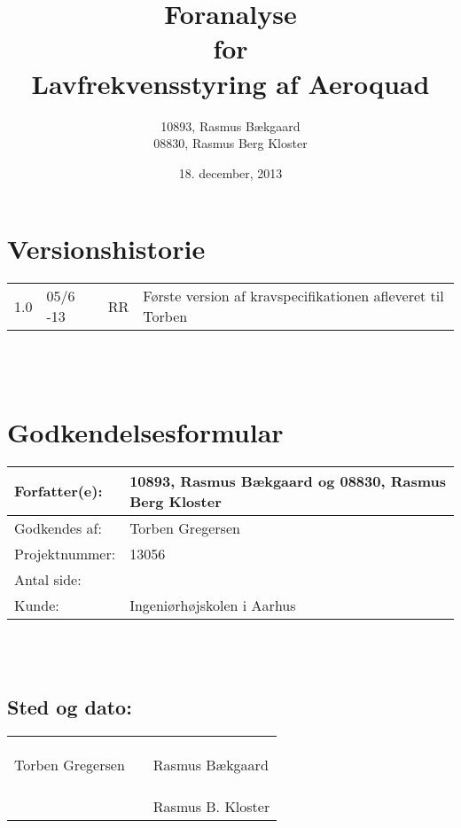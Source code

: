 \documentclass[oneside, 12pt]{memoir}
\title{Foranalyse \\ for \\ Lavfrekvensstyring af Aeroquad}
\date{18. december, 2013}
\author{10893, Rasmus Bækgaard\\08830, Rasmus Berg Kloster}
\begin{document}
\begin{titlingpage}
  \maketitle
\end{titlingpage}


\section*{Versionshistorie}
\begin{tabular}{l|l|l|l}
1.0 & 05/6 -13 & RR & Første version af kravspecifikationen afleveret til Torben 
\end{tabular} 
\\
\\
\section*{Godkendelsesformular}
\begin{tabular}{l|l}
\hline 
Forfatter(e): & 10893, Rasmus Bækgaard og 08830, Rasmus Berg Kloster\\ 
\hline 
Godkendes af: & Torben Gregersen \\ 
\hline
Projektnummer: & 13056\\
\hline
Antal side: & \pageref{LastPage} \\
\hline 
Kunde: & Ingeniørhøjskolen i Aarhus \\
\hline
\end{tabular} 
\\
\\
\subsection*{Sted og dato:}
\begin{tabular}{lll}
&& \\
&& \\
\underline{\qquad \qquad \qquad \qquad \qquad} & \qquad \qquad \qquad & \underline{\qquad \qquad \qquad \qquad \qquad}  \\ 
Torben Gregersen & & Rasmus Bækgaard \\ \\\\
&&  \underline{\qquad \qquad \qquad \qquad \qquad}  \\
& & Rasmus B. Kloster
\end{tabular} 




\newpage
\tableofcontents*
\newpage
\listoffixmes 



\newpage
\appendix

\nocite{*}


\end{document}
